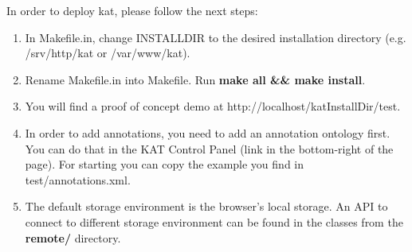 \documentclass[a4paper, 12pt, notitlepage]{report}
\begin{document}
In order to deploy kat, please follow the next steps:

\begin{enumerate}
 \item In Makefile.in, change INSTALLDIR to the desired installation directory (e.g. /srv/http/kat or /var/www/kat).
 \item Rename Makefile.in into Makefile. Run \textbf{make all \&\& make install}. 
 \item You will find a proof of concept demo at http://localhost/katInstallDir/test.
 \item In order to add annotations, you need to add an annotation ontology first. You can do that in the KAT Control Panel 
(link in the bottom-right of the page). For starting you can copy the example you find in test/annotations.xml.
 \item The default storage environment is the browser's local storage. An API to connect to different storage environment
can be found in the classes from the \textbf{remote/} directory.
\end{enumerate} 

%
\end{document}
